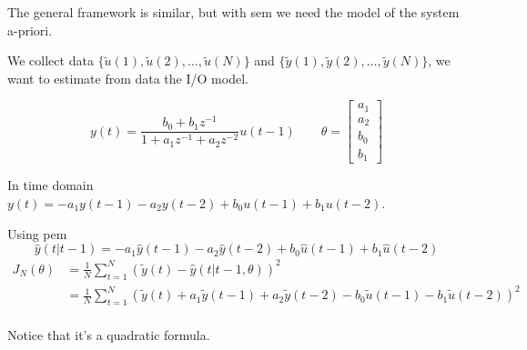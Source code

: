 The general framework is similar, but with \gls{sem} we need the model of the system a-priori.
\begin{exa}
    We collect data $\{ \tilde{u}(1), \tilde{u}(2), \dots, \tilde{u}(N) \}$ and $\{ \tilde{y}(1), \tilde{y}(2), \dots, \tilde{y}(N) \}$, we want to estimate from data the I/O model.

    \[
        y(t) = \frac{b_0 + b_1z^{-1}}{1+a_1z^{-1} + a_2z^{-2}}u(t-1) \qquad \theta = \begin{bmatrix}
            a_1 \\ a_2 \\ b_0 \\ b_1
        \end{bmatrix}
    \]

    In time domain $y(t) = -a_1y(t-1)-a_2y(t-2)+b_0u(t-1)+b_1u(t-2)$.

    Using \gls{pem}
    \[
        \hat{y}(t|t-1) = -a_1\hat{y}(t-1)-a_2\hat{y}(t-2)+b_0\hat{u}(t-1)+b_1\hat{u}(t-2)
    \]
    \begin{align*}
        J_N(\theta) &= \frac{1}{N}\sum_{t=1}^N \left( \tilde{y}(t) - \hat{y}(t|t-1, \theta) \right)^2 \\
        &= \frac{1}{N}\sum_{t=1}^N \left( \tilde{y}(t) +a_1\tilde{y}(t-1)+a_2\tilde{y}(t-2)-b_0\tilde{u}(t-1)-b_1\tilde{u}(t-2) \right)^2 \\
    \end{align*}

    Notice that it's a quadratic formula.

    \begin{figure}[H]
        \begin{minipage}[t]{0.5\textwidth}
            \centering
\end{minipage}
\end{figure}
\end{exa}

